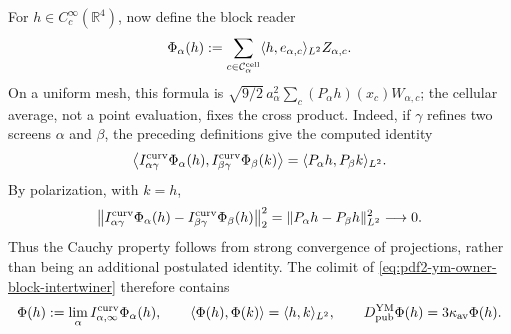 For $h\in C_c^\infty(\mathbb R^4)$, now define the block reader
\begin{equation}\label{eq:pdf2-ym-owner-smeared-witness}
 \Phi_\alpha(h):=
 \sum_{c\in\mathcal C_\alpha^{\rm cell}}
 \langle h,e_{\alpha,c}\rangle_{L^2}Z_{\alpha,c}.
\end{equation}
On a uniform mesh, this formula is
$\sqrt{9/2}\,a_\alpha^2\sum_c(P_\alpha h)(x_c)W_{\alpha,c}$; the cellular average,
not a point evaluation, fixes the cross product. Indeed, if $\gamma$ refines
two screens $\alpha$ and $\beta$, the preceding definitions give the computed
identity
\begin{equation}\label{eq:pdf2-ym-owner-smeared-cross-gram}
 \left\langle
  I_{\alpha\gamma}^{\rm curv}\Phi_\alpha(h),
  I_{\beta\gamma}^{\rm curv}\Phi_\beta(k)
 \right\rangle
 =\langle P_\alpha h,P_\beta k\rangle_{L^2}.
\end{equation}
By polarization, with $k=h$,
\begin{equation}\label{eq:pdf2-ym-owner-smeared-cauchy-derived}
 \left\|
  I_{\alpha\gamma}^{\rm curv}\Phi_\alpha(h)
  -I_{\beta\gamma}^{\rm curv}\Phi_\beta(h)
 \right\|_2^2
 =\|P_\alpha h-P_\beta h\|_{L^2}^2\longrightarrow0.
\end{equation}
Thus the Cauchy property follows from strong convergence of
projections, rather than being an additional postulated identity. The colimit of
\eqref{eq:pdf2-ym-owner-block-intertwiner} therefore contains
\begin{equation}\label{eq:pdf2-ym-owner-smeared-gram}
 \Phi(h):=\lim_\alpha I_{\alpha,\infty}^{\rm curv}\Phi_\alpha(h),
 \qquad
 \langle\Phi(h),\Phi(k)\rangle=\langle h,k\rangle_{L^2},
 \qquad
 D_{\rm pub}^{\rm YM}\Phi(h)=3\kappa_{\rm av}\Phi(h).
\end{equation}

